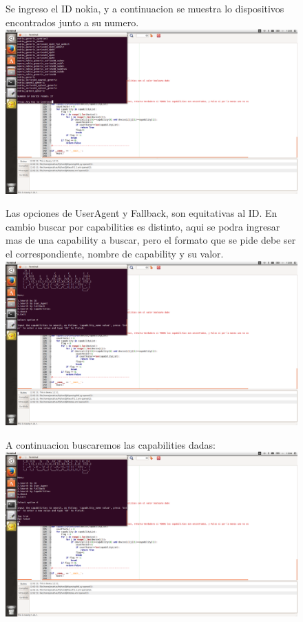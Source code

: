 \documentclass[14pt]{article} %
\begin{document}
\begin{figure}
Se ingreso el ID nokia, y a continuacion se muestra lo dispositivos encontrados junto a su numero.
\centering
\includegraphics[scale=0.22]{imagenes/sc3.png}
\end{figure}

\begin{figure}
Las opciones de UserAgent y Fallback, son equitativas al ID. En cambio buscar por capabilities es distinto, aqui se podra ingresar mas de una capability a buscar, pero el formato que se pide debe ser el correspondiente, nombre de capability y su valor.
\centering
\includegraphics[scale=0.22]{imagenes/sc4.png}
\end{figure}

\begin{figure}
A continuacion buscaremos las capabilities dadas:
\centering
\includegraphics[scale=0.22]{imagenes/sc5.png}
\end{figure}
\end{document}
